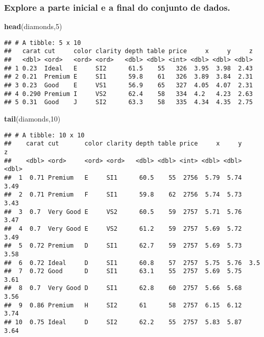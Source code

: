 \documentclass[
]{article}
\newenvironment{Shaded}{\begin{snugshade}}{\end{snugshade}}
\newcommand{\DecValTok}[1]{\textcolor[rgb]{0.00,0.00,0.81}{#1}}
\newcommand{\KeywordTok}[1]{\textcolor[rgb]{0.13,0.29,0.53}{\textbf{#1}}}
\newcommand{\NormalTok}[1]{#1}
\begin{document}
\hypertarget{explore-a-parte-inicial-e-a-final-do-conjunto-de-dados.}{%
\subsubsection{Explore a parte inicial e a final do conjunto de
dados.}\label{explore-a-parte-inicial-e-a-final-do-conjunto-de-dados.}}

\begin{Shaded}
\begin{Highlighting}[]
\KeywordTok{head}\NormalTok{(diamonds,}\DecValTok{5}\NormalTok{)}
\end{Highlighting}
\end{Shaded}

\begin{verbatim}
## # A tibble: 5 x 10
##   carat cut     color clarity depth table price     x     y     z
##   <dbl> <ord>   <ord> <ord>   <dbl> <dbl> <int> <dbl> <dbl> <dbl>
## 1 0.23  Ideal   E     SI2      61.5    55   326  3.95  3.98  2.43
## 2 0.21  Premium E     SI1      59.8    61   326  3.89  3.84  2.31
## 3 0.23  Good    E     VS1      56.9    65   327  4.05  4.07  2.31
## 4 0.290 Premium I     VS2      62.4    58   334  4.2   4.23  2.63
## 5 0.31  Good    J     SI2      63.3    58   335  4.34  4.35  2.75
\end{verbatim}

\begin{Shaded}
\begin{Highlighting}[]
\KeywordTok{tail}\NormalTok{(diamonds,}\DecValTok{10}\NormalTok{)}
\end{Highlighting}
\end{Shaded}

\begin{verbatim}
## # A tibble: 10 x 10
##    carat cut       color clarity depth table price     x     y     z
##    <dbl> <ord>     <ord> <ord>   <dbl> <dbl> <int> <dbl> <dbl> <dbl>
##  1  0.71 Premium   E     SI1      60.5    55  2756  5.79  5.74  3.49
##  2  0.71 Premium   F     SI1      59.8    62  2756  5.74  5.73  3.43
##  3  0.7  Very Good E     VS2      60.5    59  2757  5.71  5.76  3.47
##  4  0.7  Very Good E     VS2      61.2    59  2757  5.69  5.72  3.49
##  5  0.72 Premium   D     SI1      62.7    59  2757  5.69  5.73  3.58
##  6  0.72 Ideal     D     SI1      60.8    57  2757  5.75  5.76  3.5 
##  7  0.72 Good      D     SI1      63.1    55  2757  5.69  5.75  3.61
##  8  0.7  Very Good D     SI1      62.8    60  2757  5.66  5.68  3.56
##  9  0.86 Premium   H     SI2      61      58  2757  6.15  6.12  3.74
## 10  0.75 Ideal     D     SI2      62.2    55  2757  5.83  5.87  3.64
\end{verbatim}
\end{document}
